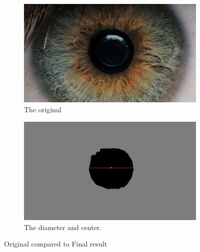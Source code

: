 \documentclass{article}
\begin{document}
%
%
\begin{figure}[H]
\centering

\begin{subfigure}{.5\textwidth}
  \centering
  \includegraphics[width=0.9\linewidth]{res/pupil/results/index.jpg}
  \caption{The original}
  \label{fig:original_img}
\end{subfigure}%
\begin{subfigure}{.5\textwidth}
  \centering
  \includegraphics[width=0.9\linewidth]{res/pupil/results/part_result_to_final_result.jpg}
  \caption{The diameter and center.}
  \label{fig:gray_img}
\end{subfigure}


\caption{Original compared to Final result}
\label{fig:result_pup_org_final}
\end{figure}
\end{document}
